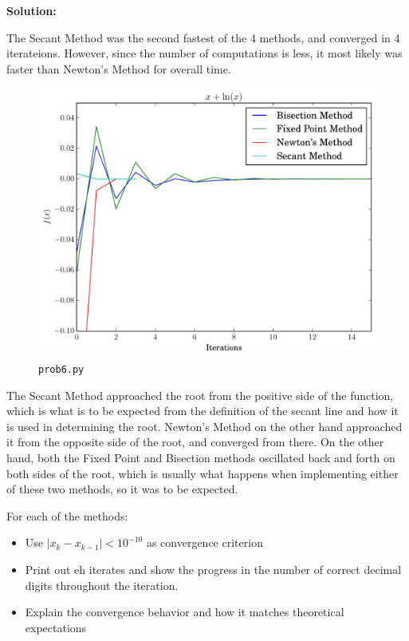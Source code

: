 \documentclass[12pt]{article}
\newcommand{\abs}[1]{\left| #1 \right|}
\begin{document}
\begin{enumerate}
\begin{enumerate}
\begin{enumerate}
    {\bf Solution:}

    The Secant Method was the second fastest of the 4 methods, and converged in 4 iterateions.
    However, since the number of computations is less, it most likely was faster than Newton's Method
    for overall time.

    \begin{figure}[H]
      \centering
      \includegraphics[width=.65\textwidth]{hw2_prob6b.pdf}
      \caption{{\tt prob6.py}}
    \end{figure}

    The Secant Method approached the root from the positive side of the function, which
    is what is to be expected from the definition of the secant line and how it
    is used in determining the root. Newton's Method on the other hand approached it from
    the opposite side of the root, and converged from there. On the other hand, both the
    Fixed Point and Bisection methods oscillated back and forth on both sides of the
    root, which is usually what happens when implementing either of these two methods,
    so it was to be expected.

    
  \end{enumerate}
  For each of the methods:
  \begin{itemize}
    \item Use $\abs{ x_{k} - x_{k-1}} < 10^{-10}$ as convergence criterion
    \item Print out eh iterates and show the progress in the number of correct decimal
    digits throughout the iteration.
    \item Explain the convergence behavior and how it matches theoretical expectations
  \end{itemize}
\end{enumerate}
\end{enumerate}
\end{document}
